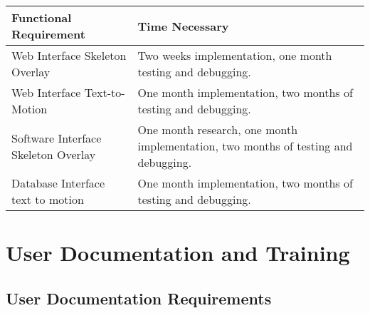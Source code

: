 \documentclass{scrreprt}
\begin{document}
\begin{longtable}[c]{@{}ll@{}}
\toprule
\begin{minipage}[t]{0.47\columnwidth}\raggedright\strut
{Functional Requirement}
\strut\end{minipage} &
\begin{minipage}[t]{0.47\columnwidth}\raggedright\strut
{Time Necessary}
\strut\end{minipage}\tabularnewline\midrule
\begin{minipage}[t]{0.47\columnwidth}\raggedright\strut
{Web Interface Skeleton Overlay}
\strut\end{minipage} &
\begin{minipage}[t]{0.47\columnwidth}\raggedright\strut
{Two weeks implementation, one month testing and debugging.}
\strut\end{minipage}\tabularnewline
\begin{minipage}[t]{0.47\columnwidth}\raggedright\strut
{Web Interface Text-to-Motion}
\strut\end{minipage} &
\begin{minipage}[t]{0.47\columnwidth}\raggedright\strut
{One month implementation, two months of testing and debugging.}
\strut\end{minipage}\tabularnewline
\begin{minipage}[t]{0.47\columnwidth}\raggedright\strut
{Software Interface Skeleton Overlay}
\strut\end{minipage} &
\begin{minipage}[t]{0.47\columnwidth}\raggedright\strut
{One month research, one month implementation, two months of testing and
        debugging.}
\strut\end{minipage}\tabularnewline
\begin{minipage}[t]{0.47\columnwidth}\raggedright\strut
{Database Interface text to motion}
\strut\end{minipage} &
\begin{minipage}[t]{0.47\columnwidth}\raggedright\strut
{One month implementation, two months of testing and debugging.}
\strut\end{minipage}\tabularnewline
\bottomrule
\end{longtable}

\section{User Documentation and Training}

\subsection{User Documentation Requirements}
\end{document}
